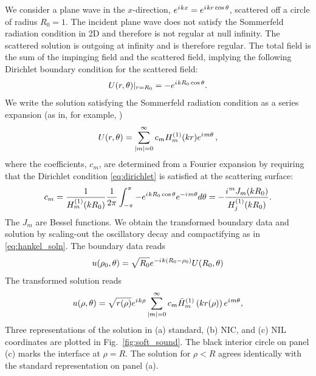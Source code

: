 \documentclass[draft,onefignum,onetabnum]{siamart190516}
\newcommand{\iu}{{i\mkern1mu}}
\begin{document}
We consider a plane wave in the $x$-direction, $e^{\iu k x} = e^{\iu k r \cos\theta}$, scattered off a circle of radius $R_0=1$. The incident plane wave does not satisfy the Sommerfeld radiation condition in 2D and therefore is not regular at null infinity. The scattered solution is outgoing at infinity and is therefore regular. The total field is the sum of the impinging field and the scattered field, implying the following Dirichlet boundary condition for the scattered field:
\begin{equation}\label{eq:dirichlet}
	U(r,\theta)|_{r=R_0} = - e^{\iu k R_0 \cos\theta}.
\end{equation}
We write the solution satisfying the Sommerfeld radiation condition as a series expansion (as in, for example, \cite{britt2010compact, yang2021truly})
\[ U(r,\theta) =  \sum_{|m|=0}^{\infty} c_m H_{m}^{(1)}(k r) e^{\iu m \theta} \,, \]
where the coefficients, $c_m$, are determined from a Fourier expansion by requiring that the Dirichlet condition \eqref{eq:dirichlet} is satisfied at the scattering surface:
\[ c_m = \frac{1}{H_{m}^{(1)}(k R_0)} \frac{1}{2\pi} \int_{-\pi}^{\pi} -e^{\iu k R_0 \cos\theta} e^{-\iu m \theta} d\theta = 
- \frac{\iu^m J_m(k R_0)}{H_{j}^{(1)}(k R_0)}. \]
The $J_m$ are Bessel functions. We obtain the transformed boundary data and solution by scaling-out the oscillatory decay and compactifying as in \eqref{eq:hankel_soln}. The boundary data reads
\[ u(\rho_0,\theta)= \sqrt{R_0} e^{-\iu k (R_0-\rho_0)} U(R_0,\theta) %
\]
The transformed solution reads
\begin{equation}\label{eq:soft_soln}
	u(\rho,\theta) = \sqrt{r(\rho)} e^{\iu k\rho} \sum_{|m|=0}^{\infty} c_m \bar{H}_{m}^{(1)}\left(k r(\rho)\right) e^{\iu m \theta},
\end{equation}
Three representations of the solution in (a) standard, (b) NIC, and (c) NIL coordinates are plotted in Fig.~\ref{fig:soft_sound}. The black interior circle on panel (c) marks the interface at $\rho=R$. The solution for $\rho<R$ agrees identically with the standard representation on panel (a). 
\end{document}
